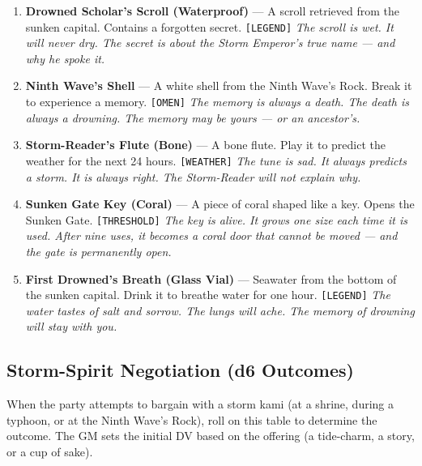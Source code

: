 \begin{enumerate}
\item \textbf{Drowned Scholar's Scroll (Waterproof)} --- A scroll retrieved from the sunken capital. Contains a forgotten secret. \texttt{[LEGEND]}
  \hfill \textit{The scroll is wet. It will never dry. The secret is about the Storm Emperor's true name --- and why he spoke it.}
\item[J] \textbf{Ninth Wave's Shell} --- A white shell from the Ninth Wave's Rock. Break it to experience a memory. \texttt{[OMEN]}
  \hfill \textit{The memory is always a death. The death is always a drowning. The memory may be yours --- or an ancestor's.}
\item[Q] \textbf{Storm-Reader's Flute (Bone)} --- A bone flute. Play it to predict the weather for the next 24 hours. \texttt{[WEATHER]}
  \hfill \textit{The tune is sad. It always predicts a storm. It is always right. The Storm-Reader will not explain why.}
\item[K] \textbf{Sunken Gate Key (Coral)} --- A piece of coral shaped like a key. Opens the Sunken Gate. \texttt{[THRESHOLD]}
  \hfill \textit{The key is alive. It grows one size each time it is used. After nine uses, it becomes a coral door that cannot be moved --- and the gate is permanently open.}
\item[A] \textbf{First Drowned's Breath (Glass Vial)} --- Seawater from the bottom of the sunken capital. Drink it to breathe water for one hour. \texttt{[LEGEND]}
  \hfill \textit{The water tastes of salt and sorrow. The lungs will ache. The memory of drowning will stay with you.}
\end{enumerate}


\subsection*{Storm-Spirit Negotiation (d6 Outcomes)}
\label{sec:nihori-storm-spirit}

When the party attempts to bargain with a storm kami (at a shrine, during a typhoon, or at the Ninth Wave's Rock), roll on this table to determine the outcome. The GM sets the initial DV based on the offering (a tide-charm, a story, or a cup of sake).

